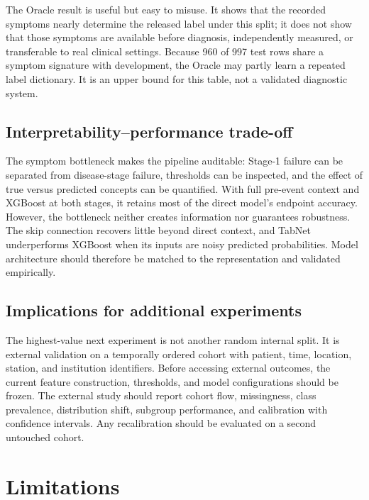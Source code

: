 \documentclass[conference]{IEEEtran}
\begin{document}
The Oracle result is useful but easy to misuse. It shows that the recorded
symptoms nearly determine the released label under this split; it does not
show that those symptoms are available before diagnosis, independently
measured, or transferable to real clinical settings. Because 960 of 997 test
rows share a symptom signature with development, the Oracle may partly learn a
repeated label dictionary. It is an upper bound for this table, not a validated
diagnostic system.

\subsection{Interpretability--performance trade-off}

The symptom bottleneck makes the pipeline auditable: Stage-1 failure can be
separated from disease-stage failure, thresholds can be inspected, and the
effect of true versus predicted concepts can be quantified. With full
pre-event context and XGBoost at both stages, it retains most of the direct
model's endpoint accuracy. However, the bottleneck neither creates information
nor guarantees robustness. The skip connection recovers little beyond direct
context, and TabNet underperforms XGBoost when its inputs are noisy predicted
probabilities. Model architecture should therefore be matched to the
representation and validated empirically.

\subsection{Implications for additional experiments}

The highest-value next experiment is not another random internal split. It is
external validation on a temporally ordered cohort with patient, time,
location, station, and institution identifiers. Before accessing external
outcomes, the current feature construction, thresholds, and model
configurations should be frozen. The external study should report cohort flow,
missingness, class prevalence, distribution shift, subgroup performance, and
calibration with confidence intervals. Any recalibration should be evaluated
on a second untouched cohort.

\section{Limitations}
\end{document}
